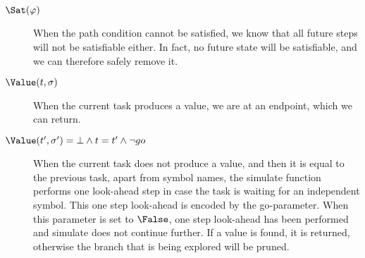 \begin{description}
  \item[$\Sat(\phi)$] When the path condition cannot be satisfied, we know that all future steps will not be satisfiable either.
  In fact, no future state will be satisfiable, and we can therefore safely remove it.
  \item[$\Value(t,\sigma)$] When the current task produces a value, we are at an endpoint, which we can return.
  \item[$\Value(t',\sigma')=\bot\land t=t'\land \neg go$] When the current task does not produce a value, and then it is equal to the previous task, apart from symbol names, the simulate function performs one look-ahead step in case the task is waiting for an independent symbol.
  This one step look-ahead is encoded by the go-parameter. When this parameter is set to $\False$, one step look-ahead has been performed and simulate does not continue further. If a value is found, it is returned, otherwise the branch that is being explored will be pruned.
\end{description}

